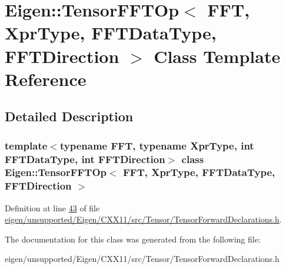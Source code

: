 \hypertarget{class_eigen_1_1_tensor_f_f_t_op}{}\section{Eigen\+:\+:Tensor\+F\+F\+T\+Op$<$ F\+FT, Xpr\+Type, F\+F\+T\+Data\+Type, F\+F\+T\+Direction $>$ Class Template Reference}
\label{class_eigen_1_1_tensor_f_f_t_op}


\subsection{Detailed Description}
\subsubsection*{template$<$typename F\+FT, typename Xpr\+Type, int F\+F\+T\+Data\+Type, int F\+F\+T\+Direction$>$\newline
class Eigen\+::\+Tensor\+F\+F\+T\+Op$<$ F\+F\+T, Xpr\+Type, F\+F\+T\+Data\+Type, F\+F\+T\+Direction $>$}



Definition at line \hyperlink{eigen_2unsupported_2_eigen_2_c_x_x11_2src_2_tensor_2_tensor_forward_declarations_8h_source_l00043}{43} of file \hyperlink{eigen_2unsupported_2_eigen_2_c_x_x11_2src_2_tensor_2_tensor_forward_declarations_8h_source}{eigen/unsupported/\+Eigen/\+C\+X\+X11/src/\+Tensor/\+Tensor\+Forward\+Declarations.\+h}.



The documentation for this class was generated from the following file\+:\begin{DoxyCompactItemize}
\item 
eigen/unsupported/\+Eigen/\+C\+X\+X11/src/\+Tensor/\+Tensor\+Forward\+Declarations.\+h\end{DoxyCompactItemize}
